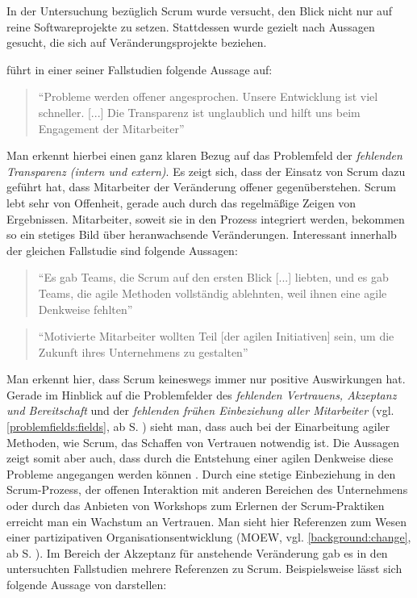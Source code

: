 In der Untersuchung bezüglich Scrum wurde versucht, den Blick nicht nur auf reine Softwareprojekte zu setzen. Stattdessen wurde gezielt nach Aussagen gesucht, die sich auf Veränderungsprojekte beziehen.

 führt in einer seiner Fallstudien folgende Aussage auf:

\begin{quote}
	``Probleme werden offener angesprochen. Unsere Entwicklung ist viel schneller. [...] Die Transparenz ist unglaublich und hilft uns beim Engagement der Mitarbeiter'' \cite[S. 5]{fuchs_adapting_2019}
\end{quote}

Man erkennt hierbei einen ganz klaren Bezug auf das Problemfeld der \textit{fehlenden Transparenz (intern und extern)}. Es zeigt sich, dass der Einsatz von Scrum dazu geführt hat, dass Mitarbeiter der Veränderung offener gegenüberstehen. Scrum lebt sehr von Offenheit, gerade auch durch das regelmäßige Zeigen von Ergebnissen. Mitarbeiter, soweit sie in den Prozess integriert werden, bekommen so ein stetiges Bild über heranwachsende Veränderungen. Interessant innerhalb der gleichen Fallstudie sind folgende Aussagen:


\begin{quote}
	``Es gab Teams, die Scrum auf den ersten Blick [...] liebten, und es gab Teams, die agile Methoden vollständig ablehnten, weil ihnen eine agile Denkweise fehlten'' \cite[S. 5]{fuchs_adapting_2019}
\end{quote}

\begin{quote}
	 ``Motivierte Mitarbeiter wollten Teil [der agilen Initiativen] sein, um die Zukunft ihres Unternehmens zu gestalten'' \cite[S. 7]{fuchs_adapting_2019}
\end{quote}


Man erkennt hier, dass Scrum keineswegs immer nur positive Auswirkungen hat. Gerade im Hinblick auf die Problemfelder des \textit{fehlenden Vertrauens, Akzeptanz und Bereitschaft} und der \textit{fehlenden frühen Einbeziehung aller Mitarbeiter} (vgl. \ref{problemfields:fields}, ab S. \pageref{problemfields:fields}) sieht man, dass auch bei der  Einarbeitung agiler Methoden, wie Scrum, das Schaffen von Vertrauen notwendig ist. Die Aussagen zeigt somit aber auch, dass durch die Entstehung einer agilen Denkweise diese Probleme angegangen werden können \cite{hofert_agile_2018}. Durch eine stetige Einbeziehung in den Scrum-Prozess, der offenen Interaktion mit anderen Bereichen des Unternehmens oder durch das Anbieten von Workshops zum Erlernen der Scrum-Praktiken erreicht man ein Wachstum an Vertrauen. Man sieht hier Referenzen zum Wesen einer partizipativen Organisationsentwicklung (MOEW, vgl.  \ref{background:change}, ab S. \pageref{background:change}). Im Bereich der Akzeptanz für anstehende Veränderung gab es in den untersuchten Fallstudien mehrere Referenzen zu Scrum. Beispielsweise lässt sich folgende Aussage von  darstellen:

